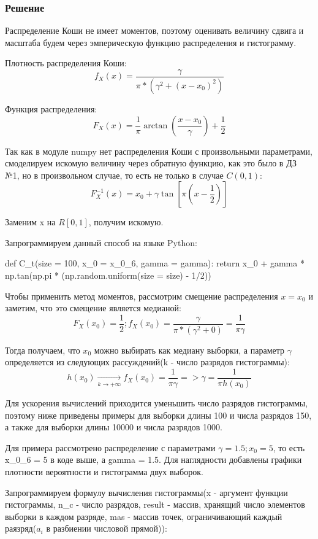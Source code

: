 \documentclass{article}
\begin{document}
\subsubsection{Решение}
Распределение Коши не имеет моментов, поэтому оценивать величину сдвига и масштаба будем через эмперическую функцию распределения и гистограмму.

Плотность распределения Коши:
\[f_X(x) = \frac{\gamma}{\pi*\left(\gamma^2+(x-x_0)^2\right)}\]

Функция распределения:
\[F_X(x) = \frac{1}{\pi}\arctan{\left(\frac{x-x_0}{\gamma}\right)} + \frac{1}{2}\]

Так как в модуле numpy нет распределения Коши с произвольными параметрами, смоделируем искомую величину через обратную функцию, как это было в ДЗ №1, но в произвольном случае, то есть не только в случае $C(0, 1)$:
\[F_X^{-1}(x) = x_0 + \gamma\tan{\left[\pi\left(x - \frac{1}{2}\right)\right]}\]

Заменим x на $R[0, 1]$, получим искомую.

Запрограммируем данный способ на языке Python:
\begin{python}
def C_t(size = 100, x_0 = x_0_6, gamma = gamma):
	return x_0 + gamma * np.tan(np.pi * (np.random.uniform(size = size) - 1/2))
\end{python}

Чтобы применить метод моментов, рассмотрим смещение распределения $x = x_0$ и заметим, что это смещение является медианой:
\[F_X(x_0) = \frac{1}{2}; f_X(x_0) =  \frac{\gamma}{\pi*\left(\gamma^2+0\right)} = \frac{1}{\pi\gamma}\]

Тогда получаем, что $x_0$ можно выбирать как медиану выборки, а параметр $\gamma$ определяется из следующих рассуждений(k - число разрядов гистограммы):
\[h(x_0) \underset{k \to +\infty}{\longrightarrow} f_X(x_0) = \frac{1}{\pi\gamma} => \gamma = \frac{1}{\pi h(x_0)}\]

Для ускорения вычислений приходится уменьшить число разрядов гистограммы, поэтому ниже приведены примеры для выборки длины 100 и числа разрядов 150, а также для выборки длины 10000 и числа разрядов 1000.

Для примера рассмотрено распределение с параметрами $\gamma = 1.5; x_0 = 5$, то есть x\_0\_6 = 5 в коде выше, а gamma = 1.5.
Для наглядности добавлены графики плотности вероятности и гистограмма двух выборок.

Запрограммируем формулу вычисления гистограммы(x - аргумент функции гистограммы, n\_c - число разрядов,
result - массив, хранящий число элементов выборки в каждом разряде, mas - массив точек, ограничивающий каждый раязряд($a_i$ в разбиении числовой прямой)):
\end{document}
